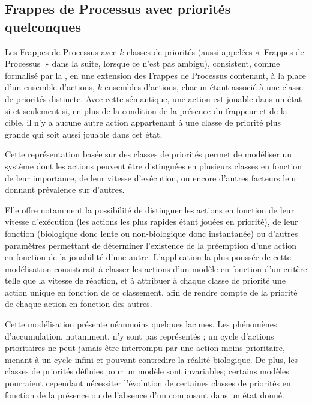 \subsection{Frappes de Processus avec priorités quelconques}

Les Frappes de Processus avec $k$ classes de priorités
(aussi appelées «~Frappes de Processus~» dans la suite, lorsque ce n'est pas ambigu),
consistent, comme formalisé par la ,
en une extension des Frappes de Processus contenant, à la place d'un ensemble d'actions,
$k$ ensembles d'actions, chacun étant associé à une classe de priorités distincte.
Avec cette sémantique, une action est jouable dans un état si et seulement si,
en plus de la condition de la présence du frappeur et de la cible,
il n'y a aucune autre action appartenant à une classe de priorité plus grande
qui soit aussi jouable dans cet état.

Cette représentation basée sur des classes de priorités permet de modéliser un système
dont les actions peuvent être distinguées en plusieurs classes en fonction de leur importance,
de leur vitesse d'exécution, ou encore d'autres facteurs leur donnant prévalence sur d'autres.

Elle offre notamment la possibilité de distinguer les actions en fonction 
de leur vitesse d'exécution (les actions les plus rapides étant jouées en priorité),
de leur fonction (biologique donc lente ou non-biologique donc instantanée)
ou d'autres paramètres permettant de déterminer l'existence de la préemption d'une action
en fonction de la jouabilité d'une autre.
L'application la plus poussée de cette modélisation consisterait à
classer les actions d'un modèle en fonction d'un critère telle que la vitesse de réaction,
et à attribuer à chaque classe de priorité une action unique en fonction de ce classement,
afin de rendre compte de la priorité de chaque action en fonction des autres.

Cette modélisation présente néanmoins quelques lacunes.
Les phénomènes d'accumulation, notamment, n'y sont pas représentés ;
un cycle d'actions prioritaires ne peut jamais être interrompu par une action moins prioritaire,
menant à un cycle infini et pouvant contredire la réalité biologique.
De plus, les classes de priorités définies pour un modèle sont invariables;
certains modèles pourraient cependant nécessiter l'évolution de certaines classes de priorités
en fonction de la présence ou de l'absence d'un composant dans un état donné.

